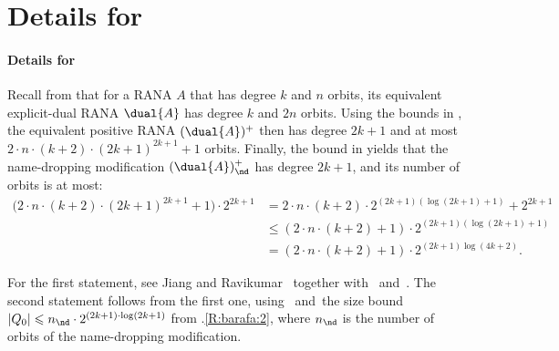 \documentclass[10pt, final, conference, a4paper, twocolumn]{IEEEtran}
\begin{document}
\section{Details for }

\paragraph*{Details for~}

Recall from  that for a RANA $A$ that has degree $k$ and $n$ orbits, its equivalent explicit-dual RANA $\dual{A}$ has degree $k$ and $2n$ orbits.
Using the bounds in , the equivalent positive RANA $(\dual{A})^+$ then has degree $2k+1$ and at most $2 \cdot n\cdot (k+2) \cdot (2k+1)^{2k+1} + 1$ orbits.
Finally, the bound in  yields that the name-dropping modification $(\dual{A})^+_{\nd}$ has degree $2k+1$, and its number of orbits is at most:
\begin{align*}
  \big(2\cdot n\cdot (k+2) \cdot (2k+1)^{2k+1} + 1\big)\cdot 2^{2k+1}
  &=
  2\cdot n\cdot (k+2) \cdot 2^{(2k+1) (\log(2k+1) +1)} + 2^{2k+1}
  \\
  &\leqslant
  (2\cdot n\cdot (k+2) + 1)\cdot 2^{(2k+1) (\log(2k+1) + 1)}
  \\
  &=
  (2\cdot n\cdot (k+2) + 1)\cdot 2^{(2k+1) \log(4k+2)}.
\end{align*}

\begin{IEEEproof}
  For the first statement, see Jiang and Ravikumar~\cite[Thm.~3.1]{jr91} together with~ and~.
  The second statement follows from the first one, using~ and~the size bound $|Q_0| \leqslant n_{\nd} \cdot 2^{(2k + 1) \cdot \log(2k + 1)}$ from .\ref{R:barafa:2}, where $n_{\nd}$ is the number of orbits of the name-dropping modification.%
\end{IEEEproof}
\end{document}
